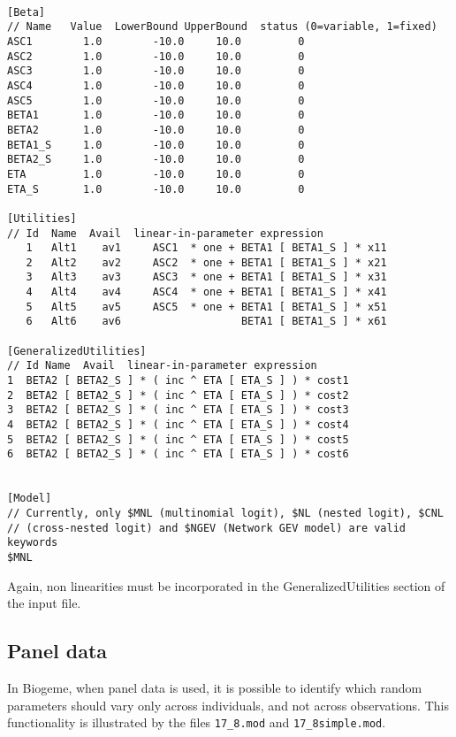 \documentclass[12pt]{memoir}
\begin{document}
\footnotesize
{\footnotesize
\begin{verbatim}

[Beta]
// Name   Value  LowerBound UpperBound  status (0=variable, 1=fixed)
ASC1        1.0        -10.0     10.0         0
ASC2        1.0        -10.0     10.0         0
ASC3        1.0        -10.0     10.0         0
ASC4        1.0        -10.0     10.0         0
ASC5        1.0        -10.0     10.0         0
BETA1       1.0        -10.0     10.0         0
BETA2       1.0        -10.0     10.0         0
BETA1_S     1.0        -10.0     10.0         0
BETA2_S     1.0        -10.0     10.0         0
ETA         1.0        -10.0     10.0         0
ETA_S       1.0        -10.0     10.0         0

[Utilities]
// Id  Name  Avail  linear-in-parameter expression 
   1   Alt1    av1     ASC1  * one + BETA1 [ BETA1_S ] * x11   
   2   Alt2    av2     ASC2  * one + BETA1 [ BETA1_S ] * x21   
   3   Alt3    av3     ASC3  * one + BETA1 [ BETA1_S ] * x31   
   4   Alt4    av4     ASC4  * one + BETA1 [ BETA1_S ] * x41   
   5   Alt5    av5     ASC5  * one + BETA1 [ BETA1_S ] * x51   
   6   Alt6    av6                   BETA1 [ BETA1_S ] * x61   
  
[GeneralizedUtilities]
// Id Name  Avail  linear-in-parameter expression 
1  BETA2 [ BETA2_S ] * ( inc ^ ETA [ ETA_S ] ) * cost1
2  BETA2 [ BETA2_S ] * ( inc ^ ETA [ ETA_S ] ) * cost2
3  BETA2 [ BETA2_S ] * ( inc ^ ETA [ ETA_S ] ) * cost3
4  BETA2 [ BETA2_S ] * ( inc ^ ETA [ ETA_S ] ) * cost4
5  BETA2 [ BETA2_S ] * ( inc ^ ETA [ ETA_S ] ) * cost5
6  BETA2 [ BETA2_S ] * ( inc ^ ETA [ ETA_S ] ) * cost6

    
[Model]
// Currently, only $MNL (multinomial logit), $NL (nested logit), $CNL
// (cross-nested logit) and $NGEV (Network GEV model) are valid keywords
$MNL
\end{verbatim}
}
\normalsize


Again, non linearities must be incorporated in the GeneralizedUtilities
section of the input file.

\subsection{Panel data}
In Biogeme, when panel data is used, it is possible to identify which random parameters should vary only across individuals, and not across observations. This functionality is illustrated by the files \verb+17_8.mod+ and \verb+17_8simple.mod+.
\end{document}
